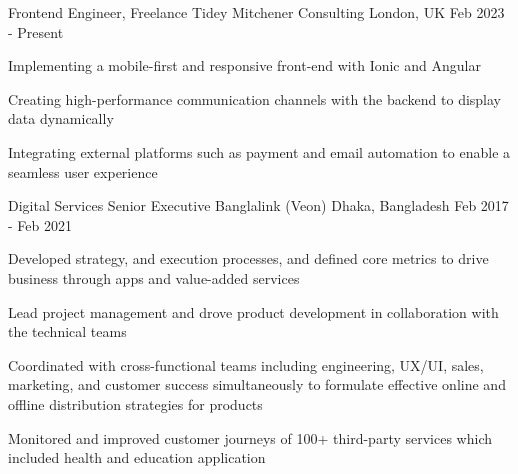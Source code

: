 

\begin{cventries}

  \cventry
    {Frontend Engineer, Freelance} %
    {Tidey Mitchener Consulting} %
    {London, UK} %
    {Feb 2023 - Present} %
    {
      \begin{cvitems} %
        \item {Implementing a mobile-first and responsive front-end with Ionic and Angular}
        \item {Creating high-performance communication channels with the backend to display data dynamically}
        \item {Integrating external platforms such as payment and email automation to enable a seamless user experience}
      \end{cvitems}
    }

  \cventry
    {Digital Services Senior Executive} %
    {Banglalink (Veon)} %
    {Dhaka, Bangladesh} %
    {Feb 2017 - Feb 2021} %
    {
      \begin{cvitems} %
        \item {Developed strategy, and execution processes, and defined core metrics to drive business through apps and value-added services}
        \item {Lead project management and drove product development in collaboration with the technical teams}
        \item {Coordinated with cross-functional teams including engineering, UX/UI, sales, marketing, and customer success simultaneously to formulate effective online and offline distribution strategies for products}
        \item {Monitored and improved customer journeys of 100+ third-party services which included health and education application}
      \end{cvitems}
    }

\end{cventries}
